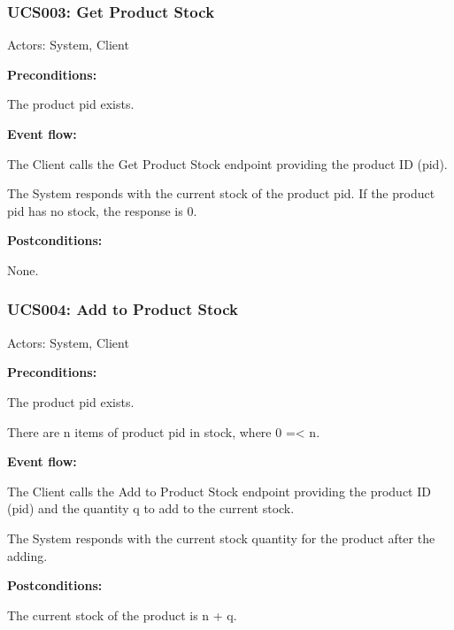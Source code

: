 \begin{ucbox}{\subsubsection{UCS003: Get Product Stock}}
\label{UCS003}

Actors: System, Client

\textbf{Preconditions:}

\ucitem The product pid exists.

\textbf{Event flow:}

\ucitem The Client calls the Get Product Stock endpoint providing the product ID (pid).

\ucitem The System responds with the current stock of the product pid. If the product pid has no stock, the response is 0.

\textbf{Postconditions:}

\ucitem None.

\end{ucbox}

\begin{ucbox}{\subsubsection{UCS004: Add to Product Stock}}
\label{UCS004}

Actors: System, Client

\textbf{Preconditions:}

\ucitem The product pid exists.

\ucitem There are n items of product pid in stock, where 0 =< n. 

\textbf{Event flow:}

\ucitem The Client calls the Add to Product Stock endpoint providing the product ID (pid) and the quantity q to add to the current stock.

\ucitem The System responds with the current stock quantity for the product after the adding.

\textbf{Postconditions:}

\ucitem The current stock of the product is n + q.

\end{ucbox}

